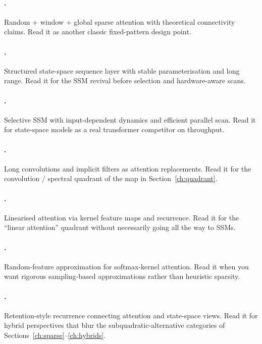 \paragraph{\citet{zaheer2020bigbird}.}
Random + window + global sparse attention with theoretical connectivity claims.
Read it as another classic fixed-pattern design point.

\paragraph{\citet{gu2021s4}.}
Structured state-space sequence layer with stable parameterisation and long
range. Read it for the SSM revival before selection and hardware-aware scans.

\paragraph{\citet{gu2023mamba}.}
Selective SSM with input-dependent dynamics and efficient parallel scan. Read
it for state-space models as a real transformer competitor on throughput.

\paragraph{\citet{poli2023hyena}.}
Long convolutions and implicit filters as attention replacements. Read it for
the convolution / spectral quadrant of the map in Section~\ref{ch:quadrant}.

\paragraph{\citet{katharopoulos2020linear}.}
Linearised attention via kernel feature maps and recurrence. Read it for the
``linear attention'' quadrant without necessarily going all the way to SSMs.

\paragraph{\citet{choromanski2021performer}.}
Random-feature approximation for softmax-kernel attention. Read it when you
want rigorous sampling-based approximations rather than heuristic sparsity.

\paragraph{\citet{sun2023retnet}.}
Retention-style recurrence connecting attention and state-space views. Read it
for hybrid perspectives that blur the subquadratic-alternative categories of Sections~\ref{ch:sparse}--\ref{ch:hybrids}.

